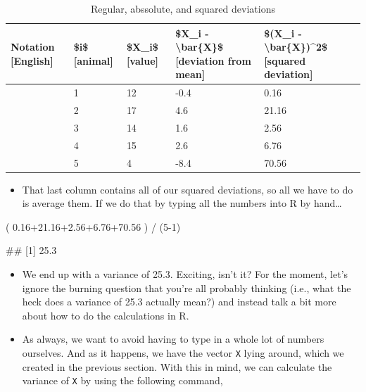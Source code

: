 \documentclass[
]{book}
\newenvironment{Shaded}{\begin{snugshade}}{\end{snugshade}}
\newcommand{\DecValTok}[1]{\textcolor[rgb]{0.00,0.00,0.81}{#1}}
\newcommand{\FloatTok}[1]{\textcolor[rgb]{0.00,0.00,0.81}{#1}}
\newcommand{\NormalTok}[1]{#1}
\newcommand{\SpecialCharTok}[1]{\textcolor[rgb]{0.00,0.00,0.00}{#1}}
\providecommand{\tightlist}{%
  \setlength{\itemsep}{0pt}\setlength{\parskip}{0pt}}
\begin{document}
\begin{table}

\caption{\label{tab:unnamed-chunk-188}Regular, abssolute, and squared deviations}
\centering
\begin{tabular}[t]{lllll}
\toprule
Notation [English] & \$i\$ [animal] & \$X\_i\$ [value] & \$X\_i - \textbackslash{}bar\{X\}\$ [deviation from mean] & \$(X\_i - \textbackslash{}bar\{X\})\textasciicircum{}2\$ [squared deviation]\\
\midrule
 & 1 & 12 & -0.4 & 0.16\\
 & 2 & 17 & 4.6 & 21.16\\
 & 3 & 14 & 1.6 & 2.56\\
 & 4 & 15 & 2.6 & 6.76\\
 & 5 & 4 & -8.4 & 70.56\\
\bottomrule
\end{tabular}
\end{table}

\begin{itemize}
\tightlist
\item
  That last column contains all of our squared deviations, so all we have to do is average them. If we do that by typing all the numbers into R by hand\ldots{}
\end{itemize}

\begin{Shaded}
\begin{Highlighting}[]
\NormalTok{( }\FloatTok{0.16+21.16+2.56+6.76+70.56}\NormalTok{ ) }\SpecialCharTok{/}\NormalTok{ (}\DecValTok{5{-}1}\NormalTok{)}
\end{Highlighting}
\end{Shaded}

\begin{Shaded}
\begin{Highlighting}[]
\NormalTok{\#\# [1] 25.3}
\end{Highlighting}
\end{Shaded}

\begin{itemize}
\item
  We end up with a variance of 25.3. Exciting, isn't it? For the moment, let's ignore the burning question that you're all probably thinking (i.e., what the heck does a variance of 25.3 actually mean?) and instead talk a bit more about how to do the calculations in R.
\item
  As always, we want to avoid having to type in a whole lot of numbers ourselves. And as it happens, we have the vector \texttt{X} lying around, which we created in the previous section. With this in mind, we can calculate the variance of \texttt{X} by using the following command,
\end{itemize}
\end{document}
